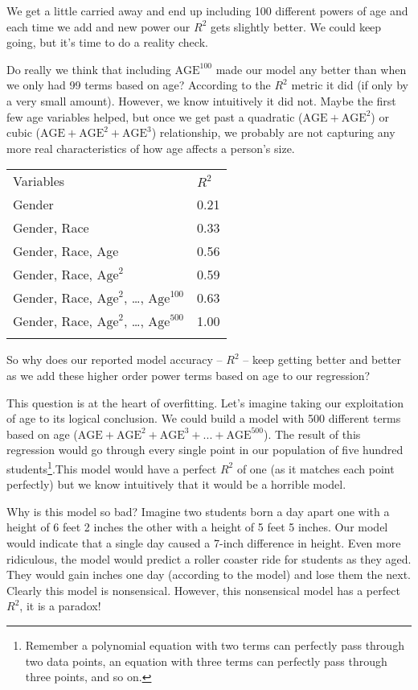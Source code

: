\documentclass[]{memoir}
\begin{document}
We get a little carried away and end up including 100 different powers
of age and each time we add and new power our $R^2$ gets slightly
better. We could keep going, but it's time to do a reality check.

Do really we think that including $\text{AGE}^{100}$ made our model any
better than when we only had 99 terms based on age? According to the
$R^2$ metric it did (if only by a very small amount). However, we know
intuitively it did not. Maybe the first few age variables helped, but
once we get past a quadratic ($\text{AGE}+\text{AGE}^2$) or cubic
($\text{AGE}+\text{AGE}^2+\text{AGE}^3$) relationship, we probably are
not capturing any more real characteristics of how age affects a
person's size.

\begin{longtable}[c]{@{}ll@{}}
\hline\noalign{\medskip}
Variables & $R^2$
\\\noalign{\medskip}
\hline\noalign{\medskip}
Gender & 0.21
\\\noalign{\medskip}
Gender, Race & 0.33
\\\noalign{\medskip}
Gender, Race, Age & 0.56
\\\noalign{\medskip}
Gender, Race, $\text{Age}^2$ & 0.59
\\\noalign{\medskip}
Gender, Race, $\text{Age}^2$, \ldots{}, $\text{Age}^{100}$ & 0.63
\\\noalign{\medskip}
Gender, Race, $\text{Age}^2$, \ldots{}, $\text{Age}^{500}$ & 1.00
\\\noalign{\medskip}
\hline
\end{longtable}

So why does our reported model accuracy -- $R^2$ -- keep getting better
and better as we add these higher order power terms based on age to our
regression?

This question is at the heart of overfitting. Let's imagine taking our
exploitation of age to its logical conclusion. We could build a model
with 500 different terms based on age
($\text{AGE}+\text{AGE}^2+\text{AGE}^3+...+\text{AGE}^{500}$). The
result of this regression would go through every single point in our
population of five hundred students\footnote{Remember a polynomial
  equation with two terms can perfectly pass through two data points, an
  equation with three terms can perfectly pass through three points, and
  so on.}.This model would have a perfect $R^2$ of one (as it matches
each point perfectly) but we know intuitively that it would be a
horrible model.

Why is this model so bad? Imagine two students born a day apart one with
a height of 6 feet 2 inches the other with a height of 5 feet 5 inches.
Our model would indicate that a single day caused a 7-inch difference in
height. Even more ridiculous, the model would predict a roller coaster
ride for students as they aged. They would gain inches one day
(according to the model) and lose them the next. Clearly this model is
nonsensical. However, this nonsensical model has a perfect $R^2$, it is
a paradox!
\end{document}
